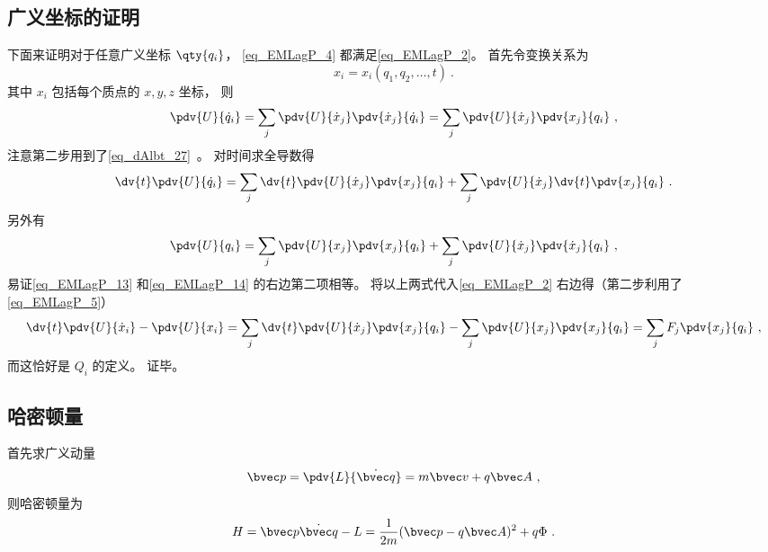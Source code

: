 \subsection{广义坐标的证明}
下面来证明对于任意广义坐标 $\qty{q_i}$， \autoref{eq_EMLagP_4} 都满足\autoref{eq_EMLagP_2}。 首先令变换关系为
\begin{equation}
x_i = x_i(q_1, q_2, \dots, t)~.
\end{equation}
其中 $x_i$ 包括每个质点的 $x, y, z$ 坐标， 则
\begin{equation}
\pdv{U}{\dot q_i} = \sum_j \pdv{U}{\dot x_j} \pdv{\dot x_j}{\dot q_i} = \sum_j \pdv{U}{\dot x_j} \pdv{x_j}{q_i}~,
\end{equation}
注意第二步用到了\autoref{eq_dAlbt_27}~。 对时间求全导数得
\begin{equation}\label{eq_EMLagP_13}
\dv{t} \pdv{U}{\dot q_i} = \sum_j \dv{t}\pdv{U}{\dot x_j} \pdv{x_j}{q_i} + \sum_j \pdv{U}{\dot x_j} \dv{t} \pdv{x_j}{q_i}~.
\end{equation}
另外有
\begin{equation}\label{eq_EMLagP_14}
\pdv{U}{q_i} = \sum_j \pdv{U}{x_j} \pdv{x_j}{q_i} + \sum_j \pdv{U}{\dot x_j} \pdv{\dot x_j}{q_i}~,
\end{equation}
易证\autoref{eq_EMLagP_13} 和\autoref{eq_EMLagP_14} 的右边第二项相等。 将以上两式代入\autoref{eq_EMLagP_2} 右边得（第二步利用了\autoref{eq_EMLagP_5}）
\begin{equation}
\dv{t} \pdv{U}{\dot x_i} - \pdv{U}{x_i} =  \sum_j \dv{t}\pdv{U}{\dot x_j} \pdv{x_j}{q_i} - \sum_j \pdv{U}{x_j} \pdv{x_j}{q_i} = \sum_j F_j \pdv{x_j}{q_i}~,
\end{equation}
而这恰好是 $Q_i$ 的定义。%
证毕。

\subsection{哈密顿量}

首先求广义动量
\begin{equation}\label{eq_EMLagP_1}
\bvec p = \pdv{L}{\dot{\bvec q}} = m\bvec v + q\bvec A~,
\end{equation}
则哈密顿量为
\begin{equation}
H = \bvec p \dot{\bvec q} - L = \frac{1}{2m}(\bvec p - q\bvec A)^2 + q\Phi~.
\end{equation}
